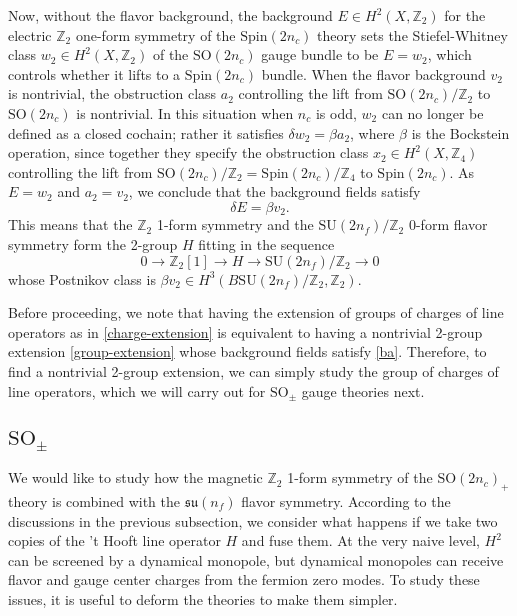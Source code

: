 \documentclass[12pt]{article}
\numberwithin{equation}{section}
\def\bZ{\mathbb{Z}}
\def\SU{\mathrm{SU}}
\def\SO{\mathrm{SO}}
\def\su{\mathfrak{su}}
\def\Spin{\mathrm{Spin}}
\begin{document}
Now, without the flavor background,  the background $E\in H^2(X,\bZ_2)$ for the electric $\bZ_2$ one-form symmetry of the $\Spin(2n_c)$ theory sets the Stiefel-Whitney class $w_2\in H^2(X,\bZ_2)$ of the $\SO(2n_c)$ gauge bundle to be $E=w_2$, which controls whether it lifts to a $\Spin(2n_c)$ bundle.
When the flavor background $v_2$ is nontrivial,
the obstruction class $a_2$ controlling the lift from $\SO(2n_c)/\bZ_2$ to $\SO(2n_c)$ is nontrivial.
In this situation when $n_c$ is odd, $w_2$ can no longer be defined as a closed cochain; rather it satisfies $\delta w_2 = \beta a_2$, where $\beta$ is the Bockstein operation,
since together they specify the obstruction class $x_2\in H^2(X,\bZ_4)$ 
controlling the lift from $\SO(2n_c)/\bZ_2=\Spin(2n_c)/\bZ_4$ to $\Spin(2n_c)$.
As $E=w_2$ and $a_2=v_2$, we conclude that the background fields satisfy \begin{equation}
\delta E=\beta v_2.
\label{ba}
\end{equation}
This means that the $\bZ_2$ 1-form symmetry and the $\SU(2n_f)/\bZ_2$ 0-form flavor symmetry form the 2-group $H$ fitting in the sequence \begin{equation}
0\to \bZ_2[1]\to H \to \SU(2n_f)/\bZ_2 \to 0
\label{group-extension}
\end{equation} whose Postnikov class is $\beta v_2 \in H^3(B\SU(2n_f)/\bZ_2,\bZ_2)$.

Before proceeding, we note that having the extension of groups of charges of line operators as in \eqref{charge-extension}
is equivalent to having a nontrivial 2-group extension \eqref{group-extension} 
whose background fields satisfy \eqref{ba}.
Therefore, to find a nontrivial 2-group extension, we can simply study the group of charges of line operators,
which we will carry out for $\SO_\pm$ gauge theories next.

\subsection{$\SO_\pm$}

We would like to study how the magnetic $\bZ_2$ 1-form symmetry of the $\SO(2n_c)_+$ theory is combined with the $\su(n_f)$ flavor symmetry.
According to the discussions in the previous subsection, 
we consider what happens if we take two copies of the 't Hooft line operator $H$ and fuse them.
At the very naive level, $H^2$ can be screened by a dynamical monopole,
but dynamical monopoles can receive flavor and gauge center charges from the fermion zero modes.
To study these issues, it is useful to deform the theories to make them simpler. 
\end{document}
